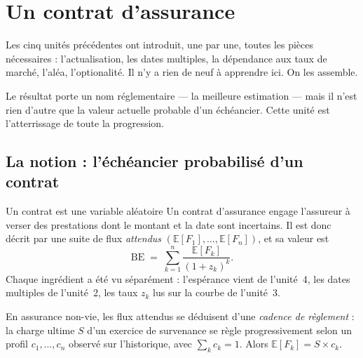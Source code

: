 \section{Un contrat d'assurance}
\label{sec:U6}

Les cinq unités précédentes ont introduit, une par une, toutes les pièces
nécessaires : l'actualisation, les dates multiples, la dépendance aux taux de
marché, l'aléa, l'optionalité. Il n'y a rien de neuf à apprendre ici. On les
assemble.

Le résultat porte un nom réglementaire --- la meilleure estimation --- mais il
n'est rien d'autre que la valeur actuelle probable d'un échéancier. Cette unité
est l'atterrissage de toute la progression.

\subsection{La notion : l'échéancier probabilisé d'un contrat}

\begin{notion}{Un contrat est une variable aléatoire}
Un contrat d'assurance engage l'assureur à verser des prestations dont le
montant et la date sont incertains. Il est donc décrit par une suite de flux
\emph{attendus} $(\mathbb{E}[F_1],\dots,\mathbb{E}[F_n])$, et sa valeur est
\[
  \mathrm{BE} \;=\; \sum_{k=1}^{n} \frac{\mathbb{E}[F_k]}{(1+z_k)^{k}} .
\]
Chaque ingrédient a été vu séparément : l'espérance vient de l'unité~4, les
dates multiples de l'unité~2, les taux $z_k$ lus sur la courbe de l'unité~3.

\medskip
En assurance non-vie, les flux attendus se déduisent d'une \emph{cadence de
règlement} : la charge ultime $S$ d'un exercice de
survenance se règle progressivement selon un profil $c_1,\dots,c_n$ observé sur
l'historique, avec $\sum_k c_k = 1$. Alors $\mathbb{E}[F_k] = S \times c_k$.
\end{notion}

\begin{center}
\end{center}

